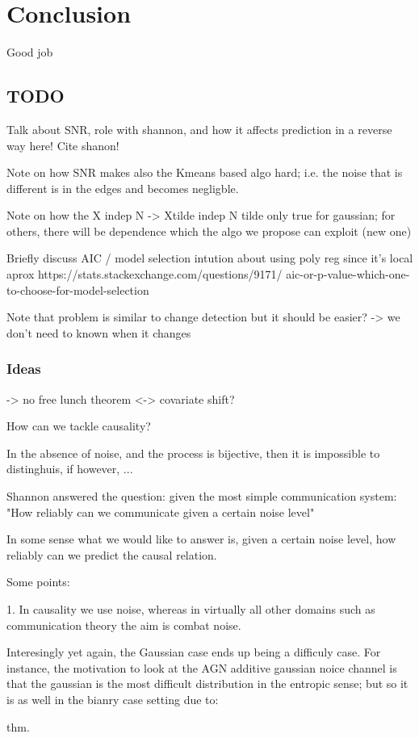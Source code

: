 \chapter{Conclusion}

Good job

\section{TODO}

Talk about SNR, role with shannon, and how it affects prediction in a reverse way here! Cite shanon!

Note on how SNR makes also the Kmeans based algo hard; i.e. the noise that is different is 
in the edges and becomes negligble.

Note on how the X indep N -> Xtilde indep N tilde only true for gaussian; for others, there 
will be dependence which the algo we propose can exploit (new one)


Briefly discuss AIC / model selection
intution about using poly reg since it's local
aprox
https://stats.stackexchange.com/questions/9171/
aic-or-p-value-which-one-to-choose-for-model-selection

Note that problem is similar to change detection
but it should be easier? -> we don't need to known
when it changes


\subsection{Ideas}

-> no free lunch theorem <-> covariate shift?




How can we tackle causality?

In the absence of noise, and the process is bijective, then it is impossible to distinghuis, 
if however, ...

Shannon answered the question: given the most simple communication system: "How reliably can 
we communicate given a certain noise level"

In some sense what we would like to answer is, given a certain noise level, how reliably can we 
predict the causal relation. 

Some points:

1. In causality we use noise, whereas in virtually all other domains
 such as communication theory the aim is combat noise.

 Interesingly yet again, the Gaussian case ends up being a difficuly case. For instance, 
 the motivation to look at the AGN additive gaussian noice channel is that the gaussian is 
 the most difficult distribution in the entropic sense; but so it is as well in the 
 bianry case setting due to:

 thm.